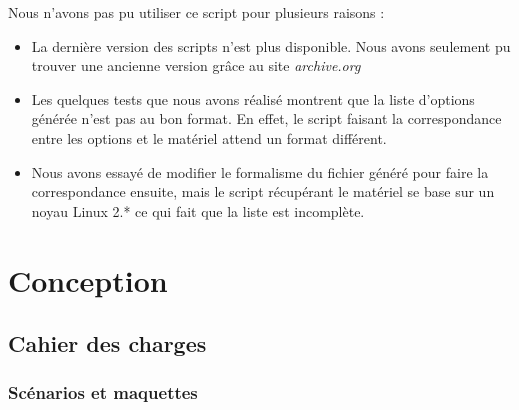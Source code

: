 \documentclass[17pts]{report}
\begin{document}
    Nous n'avons pas pu utiliser ce script pour plusieurs raisons :
    \begin{itemize}
        \item La dernière version des scripts n'est plus disponible. Nous avons
            seulement pu trouver une ancienne version grâce au site
            \textit{archive.org}
        \item Les quelques tests que nous avons réalisé montrent que la liste
            d'options générée n'est pas au bon format. En effet, le script
            faisant la correspondance entre les options et le matériel attend
            un format différent.
        \item Nous avons essayé de modifier le formalisme du fichier généré
            pour faire la correspondance ensuite, mais le script récupérant le
            matériel se base sur un noyau Linux 2.* ce qui fait que la liste
            est incomplète.
    \end{itemize}

\chapter{Conception}
\label{cha:Conception}
    \section{Cahier des charges}
    \label{sec:Cahier des charges}
        \subsection{Scénarios et maquettes}
        \label{sub:Scénarios et maquettes}
\end{document}
